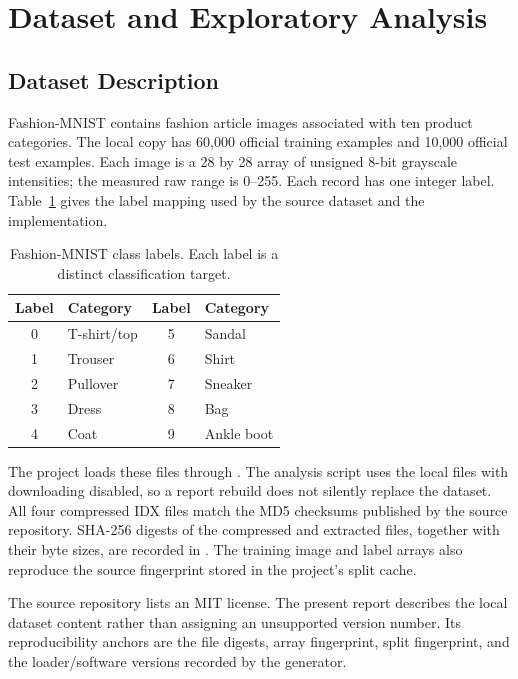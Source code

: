 \section{Dataset and Exploratory Analysis}
\label{sec:dataset}

\subsection{Dataset Description}
Fashion-MNIST contains fashion article images associated with ten product
categories\cite{xiao2017,zalando}. The local copy has 60,000 official training
examples and 10,000 official test examples. Each image is a 28 by 28 array of
unsigned 8-bit grayscale intensities; the measured raw range is 0--255.
Each record has one integer label. Table~\ref{tab:labels} gives the label
mapping used by the source dataset and the implementation.

\begin{table}[H]
\centering
\caption{Fashion-MNIST class labels. Each label is a distinct classification target.}
\label{tab:labels}
\begin{tabular}{clcl}
\toprule
Label & Category & Label & Category\\
\midrule
0 & T-shirt/top & 5 & Sandal\\
1 & Trouser & 6 & Shirt\\
2 & Pullover & 7 & Sneaker\\
3 & Dress & 8 & Bag\\
4 & Coat & 9 & Ankle boot\\
\bottomrule
\end{tabular}
\end{table}

The project loads these files through
\cite{torchvision}.
The analysis script uses the local files with downloading disabled, so a report
rebuild does not silently replace the dataset. All four compressed IDX files
match the MD5 checksums published by the source repository\cite{zalando}.
SHA-256 digests of the compressed and extracted files, together with their byte
sizes, are recorded in . The training
image and label arrays also reproduce the source fingerprint stored in the
project's split cache.

The source repository lists an MIT license\cite{zalando}. The present report
describes the local dataset content rather than assigning an unsupported
version number. Its reproducibility anchors are the file digests, array
fingerprint, split fingerprint, and the loader/software versions recorded by
the generator.

